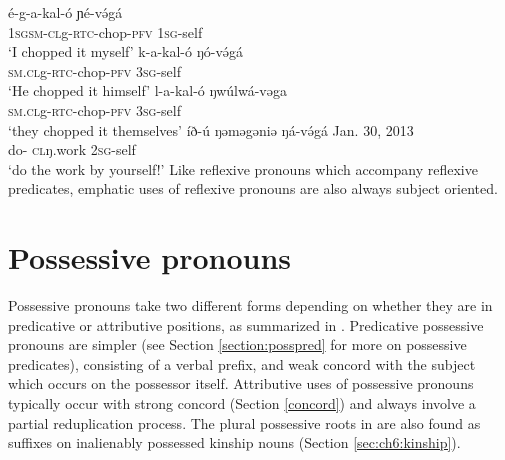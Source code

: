 \ea \ea \gll é-g-a-kal-ó 			ɲé-və́gá	\\
		1\textsc{sg}\textsc{sm}-\textsc{cl}g-\textsc{rtc}-chop-\textsc{pfv}	1\textsc{sg}-self  \\
		\glt ‘I chopped it myself’
	\ex \gll k-a-kal-ó 			ŋó-və́gá				\\
		\textsc{sm.cl}g-\textsc{rtc}-chop-\textsc{pfv}		3\textsc{sg}-self \\
		\glt ‘He chopped it himself’
	\ex \gll l-a-kal-ó 			ŋwúlwá-vəga	\\
			\textsc{sm.cl}g-\textsc{rtc}-chop-\textsc{pfv}		3\textsc{sg}-self \\
		\glt ‘they chopped it themselves’
	\ex	\gll íð-ú 	ŋəməgəniə 	ŋá-və́gá		{Jan. 30, 2013}\\
				do- \textsc{cl}ŋ.work 	2\textsc{sg}-self {} \\
		\glt ‘do the work by yourself!’
	\z
\z
Like reflexive pronouns which accompany reflexive predicates, emphatic uses of reflexive pronouns are also always subject oriented.


\section{Possessive pronouns}\label{section:posspro} %

Possessive pronouns take two different forms depending on whether they are in predicative or attributive positions, as summarized in . Predicative possessive pronouns are simpler (see Section \ref{section:posspred} for more on possessive predicates), consisting of a verbal prefix, and weak concord with the subject which occurs on the possessor itself.  Attributive uses of possessive pronouns typically occur with strong concord (Section \ref{concord}) and always involve a partial reduplication process. The plural possessive roots in  are also found as suffixes on inalienably possessed kinship nouns (Section \ref{sec:ch6:kinship}).

